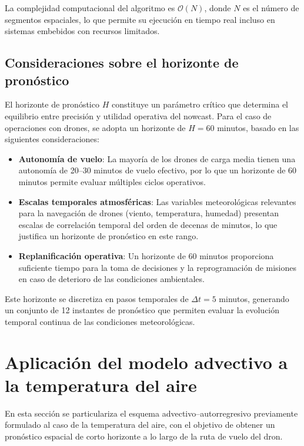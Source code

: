 \documentclass[
  spanish,
  us-letterpaper,
]{scrreprt}
\numberwithin{equation}{section}
\begin{document}
La complejidad computacional del algoritmo es \(\mathcal{O}(N)\), donde
\(N\) es el número de segmentos espaciales, lo que permite su ejecución
en tiempo real incluso en sistemas embebidos con recursos limitados.

\subsection{Consideraciones sobre el horizonte de
pronóstico}\label{consideraciones-sobre-el-horizonte-de-pronuxf3stico}

El horizonte de pronóstico \(H\) constituye un parámetro crítico que
determina el equilibrio entre precisión y utilidad operativa del
nowcast. Para el caso de operaciones con drones, se adopta un horizonte
de \(H = 60\) minutos, basado en las siguientes consideraciones:

\begin{itemize}
\item
  \textbf{Autonomía de vuelo}: La mayoría de los drones de carga media
  tienen una autonomía de 20--30 minutos de vuelo efectivo, por lo que
  un horizonte de 60 minutos permite evaluar múltiples ciclos
  operativos.
\item
  \textbf{Escalas temporales atmosféricas}: Las variables meteorológicas
  relevantes para la navegación de drones (viento, temperatura, humedad)
  presentan escalas de correlación temporal del orden de decenas de
  minutos, lo que justifica un horizonte de pronóstico en este rango.
\item
  \textbf{Replanificación operativa}: Un horizonte de 60 minutos
  proporciona suficiente tiempo para la toma de decisiones y la
  reprogramación de misiones en caso de deterioro de las condiciones
  ambientales.
\end{itemize}

Este horizonte se discretiza en pasos temporales de \(\Delta t = 5\)
minutos, generando un conjunto de 12 instantes de pronóstico que
permiten evaluar la evolución temporal continua de las condiciones
meteorológicas.

\section{Aplicación del modelo advectivo a la temperatura del
aire}\label{aplicaciuxf3n-del-modelo-advectivo-a-la-temperatura-del-aire}

En esta sección se particulariza el esquema advectivo--autorregresivo
previamente formulado al caso de la temperatura del aire, con el
objetivo de obtener un pronóstico espacial de corto horizonte a lo largo
de la ruta de vuelo del dron.
\end{document}
